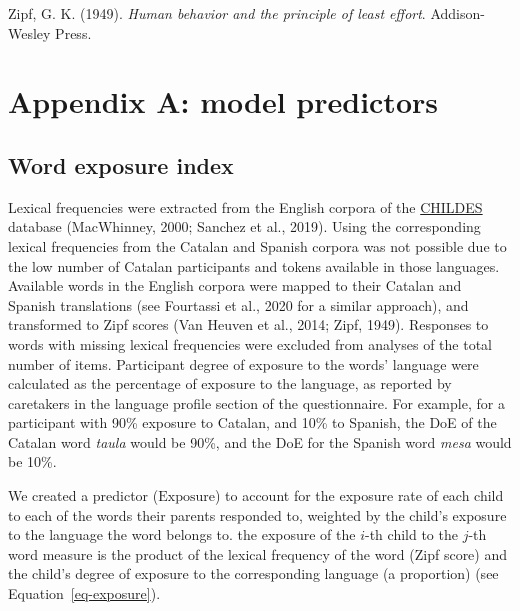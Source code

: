 \documentclass[
  man,
  floatsintext,
  colorlinks=true,linkcolor=blue,citecolor=blue,urlcolor=blue,biblatex]{apa7}
\newlength{\cslhangindent}
\newlength{\cslentryspacingunit} %
\newenvironment{CSLReferences}[2] %
 {%
  \setlength{\parindent}{0pt}
  \ifodd #1
  \let\oldpar\par
  \def\par{\hangindent=\cslhangindent\oldpar}
  \fi
  \setlength{\parskip}{#2\cslentryspacingunit}
 }%
 {}
\begin{document}
\begin{CSLReferences}{1}{0}
\leavevmode{}%
Zipf, G. K. (1949). \emph{Human behavior and the principle of least
effort}. Addison-Wesley Press.

\end{CSLReferences}

\newpage{}

\hypertarget{appendix-a-model-predictors}{%
\section*{Appendix A: model
predictors}\label{appendix-a-model-predictors}}

\hypertarget{word-exposure-index}{%
\subsection*{Word exposure index}\label{word-exposure-index}}

Lexical frequencies were extracted from the English corpora of the
\href{https://childes.talkbank.org/}{CHILDES} database (MacWhinney,
2000; Sanchez et al., 2019). Using the corresponding lexical frequencies
from the Catalan and Spanish corpora was not possible due to the low
number of Catalan participants and tokens available in those languages.
Available words in the English corpora were mapped to their Catalan and
Spanish translations (see Fourtassi et al., 2020 for a similar
approach), and transformed to Zipf scores (Van Heuven et al., 2014;
Zipf, 1949). Responses to words with missing lexical frequencies were
excluded from analyses of the total number of items. Participant degree
of exposure to the words' language were calculated as the percentage of
exposure to the language, as reported by caretakers in the language
profile section of the questionnaire. For example, for a participant
with 90\% exposure to Catalan, and 10\% to Spanish, the DoE of the
Catalan word \emph{taula} would be 90\%, and the DoE for the Spanish
word \emph{mesa} would be 10\%.

We created a predictor (\(\text{Exposure}\)) to account for the exposure
rate of each child to each of the words their parents responded to,
weighted by the child's exposure to the language the word belongs to.
the exposure of the \(i\)-th child to the \(j\)-th word measure is the
product of the lexical frequency of the word (Zipf score) and the
child's degree of exposure to the corresponding language (a proportion)
(see Equation~\ref{eq-exposure}).
\end{document}
